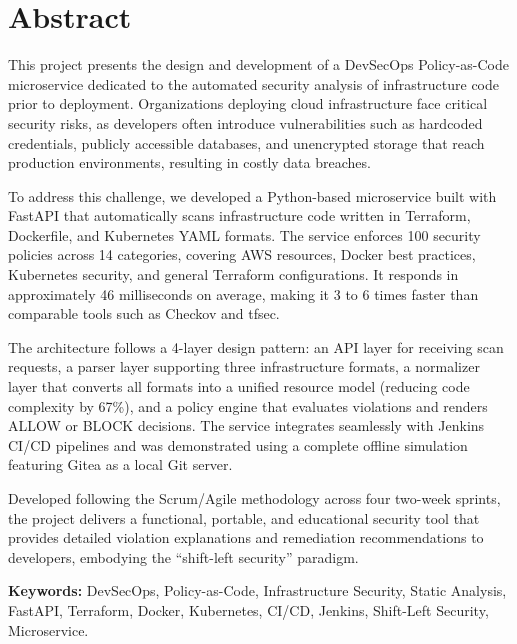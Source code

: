 
\chapter*{Abstract}

This project presents the design and development of a DevSecOps Policy-as-Code microservice dedicated to the automated security analysis of infrastructure code prior to deployment. Organizations deploying cloud infrastructure face critical security risks, as developers often introduce vulnerabilities such as hardcoded credentials, publicly accessible databases, and unencrypted storage that reach production environments, resulting in costly data breaches.

To address this challenge, we developed a Python-based microservice built with FastAPI that automatically scans infrastructure code written in Terraform, Dockerfile, and Kubernetes YAML formats. The service enforces 100 security policies across 14 categories, covering AWS resources, Docker best practices, Kubernetes security, and general Terraform configurations. It responds in approximately 46 milliseconds on average, making it 3 to 6 times faster than comparable tools such as Checkov and tfsec.

The architecture follows a 4-layer design pattern: an API layer for receiving scan requests, a parser layer supporting three infrastructure formats, a normalizer layer that converts all formats into a unified resource model (reducing code complexity by 67\%), and a policy engine that evaluates violations and renders ALLOW or BLOCK decisions. The service integrates seamlessly with Jenkins CI/CD pipelines and was demonstrated using a complete offline simulation featuring Gitea as a local Git server.

Developed following the Scrum/Agile methodology across four two-week sprints, the project delivers a functional, portable, and educational security tool that provides detailed violation explanations and remediation recommendations to developers, embodying the ``shift-left security'' paradigm.

\vspace{0.5cm}
\noindent \textbf{Keywords:} DevSecOps, Policy-as-Code, Infrastructure Security, Static Analysis, FastAPI, Terraform, Docker, Kubernetes, CI/CD, Jenkins, Shift-Left Security, Microservice.

